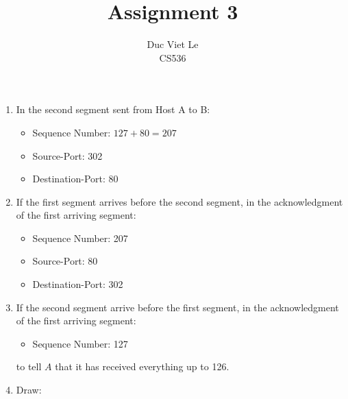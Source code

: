 \documentclass[11pt]{article}
\newenvironment{problem}[2][Problem]{\begin{trivlist}
\item[\hskip \labelsep {\bfseries #1}\hskip \labelsep {\bfseries #2.}]}{\end{trivlist}}
\begin{document}
\title{Assignment 3}
\author{Duc Viet Le\\ CS536}
 
\maketitle

\begin{problem}{1}
\end{problem}
\begin{enumerate}
	\item[a.] In the second segment sent from Host A to B:
	\begin{itemize}
		\item Sequence Number: $127+80=207$ 
		\item Source-Port: 302
		\item Destination-Port: 80
	\end{itemize}
	\item[b.] If the first segment arrives before the second segment, in the acknowledgment of the first arriving segment:
	\begin{itemize}
		\item Sequence Number: 207
		\item Source-Port: 80
		\item Destination-Port: 302
	\end{itemize}
	\item[c.] If the second segment arrive before the first segment, in the acknowledgment of the first arriving segment:
	\begin{itemize}
		\item Sequence Number: 127 
	\end{itemize}
	to tell $A$ that it has received everything up to 126.
	\item[d.] Draw:
	\pagebreak
\end{enumerate}
\end{document}
